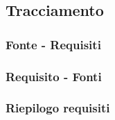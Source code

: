 \subsection{Tracciamento}\label{Tracciamento}

\subsubsection{Fonte - Requisiti} \label{FonteReq}


\subsubsection{Requisito - Fonti} \label{ReqFonte}


\newpage
\subsubsection{Riepilogo requisiti} \label{Riepilogo}


